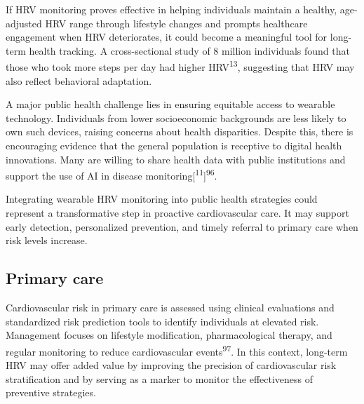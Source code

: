 \documentclass[
  a4paper,
  headsepline=true,
  open=any]{scrbook}
\begin{document}
If HRV monitoring proves effective in helping individuals maintain a
healthy, age-adjusted HRV range through lifestyle changes and prompts
healthcare engagement when HRV deteriorates, it could become a
meaningful tool for long-term health tracking. A cross-sectional study
of 8 million individuals found that those who took more steps per day
had higher HRV\textsuperscript{13}, suggesting that HRV may also reflect
behavioral adaptation.

A major public health challenge lies in ensuring equitable access to
wearable technology. Individuals from lower socioeconomic backgrounds
are less likely to own such devices, raising concerns about health
disparities. Despite this, there is encouraging evidence that the
general population is receptive to digital health innovations. Many are
willing to share health data with public institutions and support the
use of AI in disease
monitoring{[}\textsuperscript{11}{]}\textsuperscript{96}.

Integrating wearable HRV monitoring into public health strategies could
represent a transformative step in proactive cardiovascular care. It may
support early detection, personalized prevention, and timely referral to
primary care when risk levels increase.

\hypertarget{primary-care}{%
\subsection{Primary care}\label{primary-care}}

Cardiovascular risk in primary care is assessed using clinical
evaluations and standardized risk prediction tools to identify
individuals at elevated risk. Management focuses on lifestyle
modification, pharmacological therapy, and regular monitoring to reduce
cardiovascular events\textsuperscript{97}. In this context, long-term
HRV may offer added value by improving the precision of cardiovascular
risk stratification and by serving as a marker to monitor the
effectiveness of preventive strategies.
\end{document}
